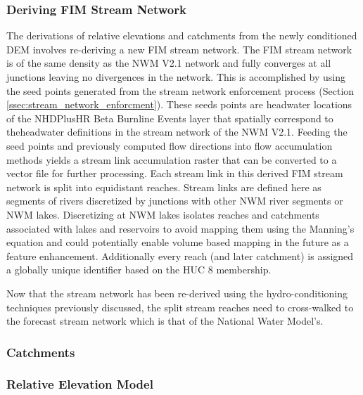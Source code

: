 \subsubsection{Deriving FIM Stream Network}
%
The derivations of relative elevations and catchments from the newly conditioned DEM involves re-deriving a new FIM stream network. 
The FIM stream network is of the same density as the NWM V2.1 network and fully converges at all junctions leaving no divergences in the network.
This is accomplished by using the seed points generated from the stream network enforcement process (Section \ref{ssec:stream_network_enforcment}).
These seeds points are headwater locations of the NHDPlusHR Beta Burnline Events layer that spatially correspond to theheadwater definitions in the stream network of the NWM V2.1.
Feeding the seed points and previously computed flow directions into flow accumulation methods \cite{wallis2009parallel,tarboton1997new,tarboton2005terrain} yields a stream link accumulation raster that can be converted to a vector file for further processing.
Each stream link in this derived FIM stream network is split into equidistant reaches.
Stream links are defined here as segments of rivers discretized by junctions with other NWM river segments or NWM lakes.
Discretizing at NWM lakes isolates reaches and catchments associated with lakes and reservoirs to avoid mapping them using the Manning's equation and could potentially enable volume based mapping in the future as a feature enhancement.
Additionally every reach (and later catchment) is assigned a globally unique identifier based on the HUC 8 membership.

Now that the stream network has been re-derived using the hydro-conditioning techniques previously discussed, the split stream reaches need to cross-walked to the forecast stream network which is that of the National Water Model's.
%
\subsubsection{Catchments}
%

%
\subsubsection{Relative Elevation Model}
%

%
